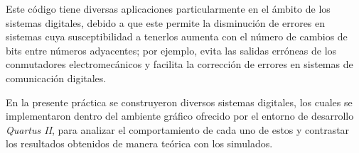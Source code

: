\documentclass[../main.tex]{subfiles}
\begin{document}
Este código tiene diversas aplicaciones particularmente en el ámbito de los 
sistemas digitales, debido a que este permite la disminución de errores en 
sistemas cuya susceptibilidad a tenerlos aumenta con el número de cambios de 
bits entre números adyacentes; por ejemplo, evita las salidas erróneas de los 
conmutadores electromecánicos y facilita la corrección de errores en sistemas 
de comunicación digitales.

En la presente práctica se construyeron diversos sistemas digitales, los 
cuales se implementaron dentro del ambiente gráfico ofrecido por el entorno de 
desarrollo \textit{Quartus II}, para analizar el comportamiento de cada uno de 
estos y contrastar los resultados obtenidos de manera teórica con los 
simulados.
\end{document}
